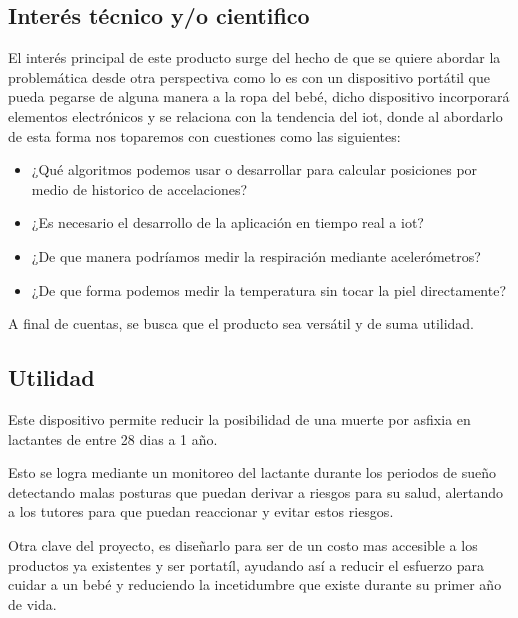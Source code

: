 \subsection{Interés técnico y/o cientifico}
El interés principal de este producto surge del hecho de que se quiere abordar la problemática desde otra perspectiva como lo es con un dispositivo portátil que pueda pegarse de alguna manera a la ropa del bebé, dicho dispositivo incorporará elementos electrónicos y se relaciona con la tendencia del \acrshort{iot}, donde al abordarlo de esta forma nos toparemos con cuestiones como las siguientes:

\begin{itemize}
    \item ¿Qué algoritmos podemos usar o desarrollar para calcular posiciones por medio de historico de accelaciones?
    \item ¿Es necesario el desarrollo de la aplicación en tiempo real a \acrshort{iot}?
    \item ¿De que manera podríamos medir la respiración mediante acelerómetros?
    \item ¿De que forma podemos medir la temperatura sin tocar la piel directamente?
\end{itemize}

A final de cuentas, se busca que el producto sea versátil y de suma utilidad.

\subsection{Utilidad}
Este dispositivo permite reducir la posibilidad de una muerte por asfixia en lactantes de entre 28 dias a 1 año.

Esto se logra mediante un monitoreo del lactante durante los periodos de sueño detectando malas posturas que puedan derivar a riesgos para su salud, alertando a los tutores para que puedan reaccionar y evitar estos riesgos.

Otra clave del proyecto, es diseñarlo para ser de un costo mas accesible a los productos ya existentes y ser portatíl, ayudando así a reducir el esfuerzo para cuidar a un bebé y reduciendo la incetidumbre que existe durante su primer año de vida.
